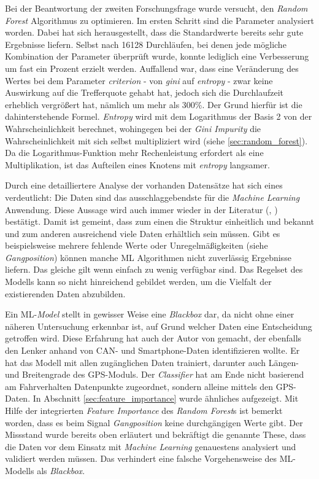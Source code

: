 Bei der Beantwortung der zweiten Forschungsfrage wurde versucht, den \textit{Random Forest} Algorithmus zu optimieren. Im ersten Schritt sind die Parameter analysiert worden. Dabei hat sich herausgestellt, dass die Standardwerte bereits sehr gute Ergebnisse liefern. Selbst nach 16128 Durchläufen, bei denen jede mögliche Kombination der Parameter überprüft wurde, konnte lediglich eine Verbesserung um fast ein Prozent erzielt werden. Auffallend war, dass eine Veränderung des Wertes bei dem Parameter \textit{criterion} - von \textit{gini} auf \textit{entropy} - zwar keine Auswirkung auf die Trefferquote gehabt hat, jedoch sich die Durchlaufzeit erheblich vergrößert hat, nämlich um mehr als 300\%. Der Grund hierfür ist die dahinterstehende Formel. \textit{Entropy} wird mit dem Logarithmus der Basis 2 von der Wahrscheinlichkeit berechnet, wohingegen bei der \textit{Gini Impurity} die Wahrscheinlichkeit mit sich selbst multipliziert wird (siehe \ref{sec:random_forest}). Da die Logarithmus-Funktion mehr Rechenleistung erfordert als eine Multiplikation, ist das Aufteilen eines Knotens mit \textit{entropy} langsamer.

Durch eine detailliertere Analyse der vorhanden Datensätze hat sich eines verdeutlicht: Die Daten sind das ausschlaggebendste für die \textit{Machine Learning} Anwendung. Diese Aussage wird auch immer wieder in der Literatur (\cite{Rebala2019}, \cite{Conway2012}) bestätigt. Damit ist gemeint, dass zum einen die Struktur einheitlich und bekannt und zum anderen ausreichend viele Daten erhältlich sein müssen. Gibt es beispielsweise mehrere fehlende Werte oder Unregelmäßigkeiten (siehe \textit{Gangposition}) können manche ML Algorithmen nicht zuverlässig Ergebnisse liefern. Das gleiche gilt wenn einfach zu wenig verfügbar sind. Das Regelset des Modells kann so nicht hinreichend gebildet werden, um die Vielfalt der existierenden Daten abzubilden.

Ein ML-\textit{Model} stellt in gewisser Weise eine \textit{Blackbox} dar, da nicht ohne einer näheren Untersuchung erkennbar ist, auf Grund welcher Daten eine Entscheidung getroffen wird. Diese Erfahrung hat auch der Autor von \cite{Gahr2019} gemacht, der ebenfalls den Lenker anhand von CAN- und Smartphone-Daten identifizieren wollte. Er hat das Modell mit allen zugänglichen Daten trainiert, darunter auch Längen- und Breitengrade des GPS-Moduls. Der \textit{Classifier} hat am Ende nicht basierend am Fahrverhalten Datenpunkte zugeordnet, sondern alleine mittels den GPS-Daten. In Abschnitt \ref{sec:feature_importance} wurde ähnliches aufgezeigt. Mit Hilfe der integrierten \textit{Feature Importance} des \textit{Random Forest}s ist bemerkt worden, dass es beim Signal \textit{Gangposition} keine durchgängigen Werte gibt. Der Missstand wurde bereits oben erläutert und bekräftigt die genannte These, dass die Daten vor dem Einsatz mit \textit{Machine Learning} genauestens analysiert und validiert werden müssen. Das verhindert eine falsche Vorgehensweise des ML-Modells als \textit{Blackbox}.

